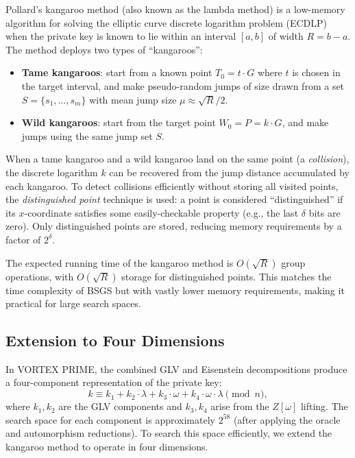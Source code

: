 \documentclass[11pt,a4paper]{article}
\theoremstyle{definition}
\begin{document}
Pollard's kangaroo method (also known as the lambda method) is a low-memory algorithm for solving the elliptic curve discrete logarithm problem (ECDLP) when the private key is known to lie within an interval $[a, b]$ of width $R = b - a$. The method deploys two types of ``kangaroos'':
\begin{itemize}
  \item \textbf{Tame kangaroos}: start from a known point $T_0 = t \cdot G$ where $t$ is chosen in the target interval, and make pseudo-random jumps of size drawn from a set $S = \{s_1, \ldots, s_m\}$ with mean jump size $\mu \approx \sqrt{R}/2$.
  \item \textbf{Wild kangaroos}: start from the target point $W_0 = P = k \cdot G$, and make jumps using the same jump set $S$.
\end{itemize}
When a tame kangaroo and a wild kangaroo land on the same point (a \emph{collision}), the discrete logarithm $k$ can be recovered from the jump distance accumulated by each kangaroo. To detect collisions efficiently without storing all visited points, the \emph{distinguished point} technique is used: a point is considered ``distinguished'' if its $x$-coordinate satisfies some easily-checkable property (e.g., the last $\delta$ bits are zero). Only distinguished points are stored, reducing memory requirements by a factor of $2^{\delta}$.

The expected running time of the kangaroo method is $O(\sqrt{R})$ group operations, with $O(\sqrt{R})$ storage for distinguished points. This matches the time complexity of BSGS but with vastly lower memory requirements, making it practical for large search spaces.

\subsection{Extension to Four Dimensions}

In VORTEX PRIME, the combined GLV and Eisenstein decompositions produce a four-component representation of the private key:
\begin{equation}
  k \equiv k_1 + k_2 \cdot \lambda + k_3 \cdot \omega + k_4 \cdot \omega \cdot \lambda \pmod{n},
  \label{eq:4d-decomp}
\end{equation}
where $k_1, k_2$ are the GLV components and $k_3, k_4$ arise from the $Z[\omega]$ lifting. The search space for each component is approximately $2^{58}$ (after applying the oracle and automorphism reductions). To search this space efficiently, we extend the kangaroo method to operate in four dimensions.
\end{document}
